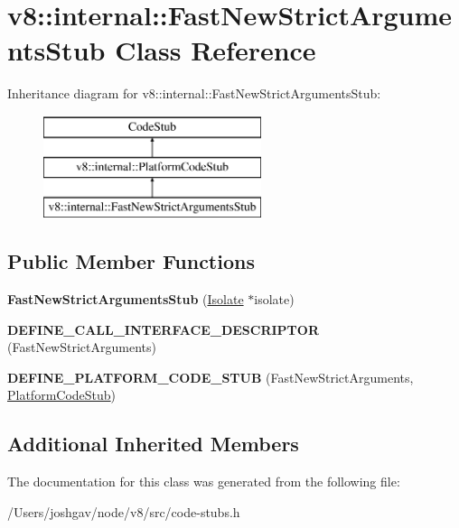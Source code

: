 \hypertarget{classv8_1_1internal_1_1_fast_new_strict_arguments_stub}{}\section{v8\+:\+:internal\+:\+:Fast\+New\+Strict\+Arguments\+Stub Class Reference}
\label{classv8_1_1internal_1_1_fast_new_strict_arguments_stub}
Inheritance diagram for v8\+:\+:internal\+:\+:Fast\+New\+Strict\+Arguments\+Stub\+:\begin{figure}[H]
\begin{center}
\leavevmode
\includegraphics[height=3.000000cm]{classv8_1_1internal_1_1_fast_new_strict_arguments_stub}
\end{center}
\end{figure}
\subsection*{Public Member Functions}
\begin{DoxyCompactItemize}
\item 
{\bfseries Fast\+New\+Strict\+Arguments\+Stub} (\hyperlink{classv8_1_1internal_1_1_isolate}{Isolate} $\ast$isolate)\hypertarget{classv8_1_1internal_1_1_fast_new_strict_arguments_stub_a08fa14c70f9af78a22d2198fd173b5b6}{}\label{classv8_1_1internal_1_1_fast_new_strict_arguments_stub_a08fa14c70f9af78a22d2198fd173b5b6}

\item 
{\bfseries D\+E\+F\+I\+N\+E\+\_\+\+C\+A\+L\+L\+\_\+\+I\+N\+T\+E\+R\+F\+A\+C\+E\+\_\+\+D\+E\+S\+C\+R\+I\+P\+T\+OR} (Fast\+New\+Strict\+Arguments)\hypertarget{classv8_1_1internal_1_1_fast_new_strict_arguments_stub_a122960f91c7085ffe49ecd966069bfe4}{}\label{classv8_1_1internal_1_1_fast_new_strict_arguments_stub_a122960f91c7085ffe49ecd966069bfe4}

\item 
{\bfseries D\+E\+F\+I\+N\+E\+\_\+\+P\+L\+A\+T\+F\+O\+R\+M\+\_\+\+C\+O\+D\+E\+\_\+\+S\+T\+UB} (Fast\+New\+Strict\+Arguments, \hyperlink{classv8_1_1internal_1_1_platform_code_stub}{Platform\+Code\+Stub})\hypertarget{classv8_1_1internal_1_1_fast_new_strict_arguments_stub_acecec85721e1dc51bc763f04a20ede26}{}\label{classv8_1_1internal_1_1_fast_new_strict_arguments_stub_acecec85721e1dc51bc763f04a20ede26}

\end{DoxyCompactItemize}
\subsection*{Additional Inherited Members}


The documentation for this class was generated from the following file\+:\begin{DoxyCompactItemize}
\item 
/\+Users/joshgav/node/v8/src/code-\/stubs.\+h\end{DoxyCompactItemize}
